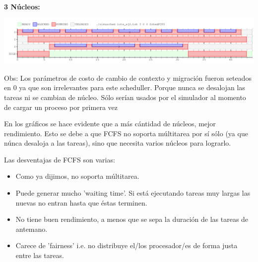 \vspace{10pt}

\textbf{3 Núcleos:}
\vspace{-20pt}
\begin{center}
 \includegraphics[scale=0.45]{./FCFS/FCFS_3core.png}
\end{center}


Obs: Los parámetros de costo de cambio de contexto y migración fueron seteados en 0 ya que son irrelevantes para este scheduller. 
Porque nunca se desalojan las tareas ni se cambian de núcleo. Sólo serían usados por el simulador al momento de cargar un proceso por primera vez

En los gráficos se hace evidente que a más cántidad de núcleos, mejor rendimiento.
Esto se debe a que FCFS no soporta múltitarea por sí sólo (ya que núnca desaloja a las tareas), sino que necesita varios núcleos para lograrlo.

Las desventajas de FCFS son varias:

\begin{itemize}
\item Como ya dijimos, no soporta múltitarea.
\item Puede generar mucho 'waiting time'.
	Si está ejecutando tareas muy largas las nuevas no entran hasta que éstas terminen.
\item No tiene buen rendimiento, a menos que se sepa la duración de las tareas de antemano.
\item Carece de 'fairness' i.e. no distribuye el/los procesador/es de forma justa entre las tareas.
\end{itemize}